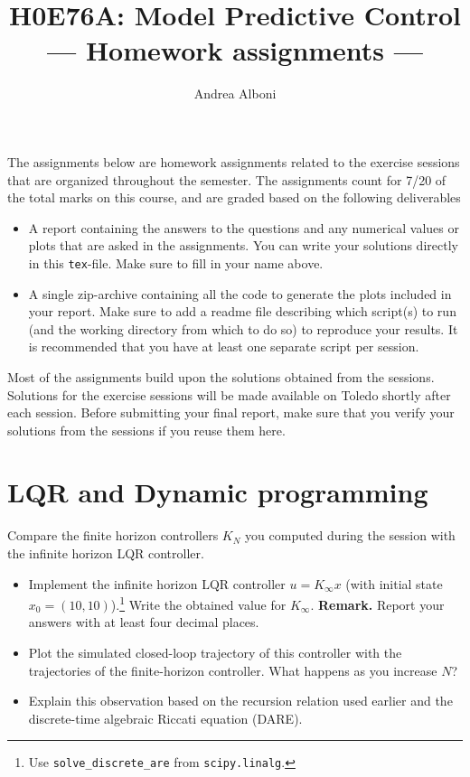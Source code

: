 \documentclass[]{article}
\title{H0E76A: Model Predictive Control\\\large--- Homework assignments ---}
\author{Andrea Alboni}
\newcommand{\assignmentweight}{7/20}
\newcommand{\toledo}{Toledo}
\begin{document}
\maketitle



The assignments below are homework assignments related to the exercise sessions that are organized throughout the 
semester.
The assignments count for \assignmentweight{} of the total marks on this course, and are graded based on the following deliverables
\begin{deliverables}
\begin{itemize}
	\item A report containing the answers to the questions and any numerical values or plots that are asked in the assignments. 
	You can write your solutions directly in this \texttt{tex}-file. Make sure to fill in your name above. 
	\item A single zip-archive containing all the code to generate the plots included in your report. 
	Make sure to add a readme file describing which script(s) to run (and the working directory from which to do so) to reproduce your results.
	It is recommended that you have at least one separate script per session.
\end{itemize}
\end{deliverables}
Most of the assignments build upon the solutions obtained from the sessions.
Solutions for the exercise sessions will be made available on \toledo{} shortly after each session. 
Before submitting your final report, make sure that you verify your solutions from the sessions if you reuse them here. 

\section{LQR and Dynamic programming}
\begin{assignment} Compare the finite horizon controllers $K_{N}$ you computed during the session with the infinite horizon LQR controller.
\begin{itemize} 
	\item Implement the infinite horizon LQR controller $u = K_{\infty} x$ (with initial state $x_0 = (10,10)$).\footnote{Use \texttt{solve\_discrete\_are} from \texttt{scipy.linalg}.} Write the obtained value for $K_\infty$.
	\textbf{Remark.} Report your answers with at least four decimal places.
	\item Plot the simulated closed-loop trajectory of this controller with the trajectories of the finite-horizon controller. What happens as 
	you increase $N$?
	\item Explain this observation based on the recursion relation used earlier and 
	the discrete-time algebraic Riccati equation (DARE).
\end{itemize}
\end{assignment}
\end{document}
